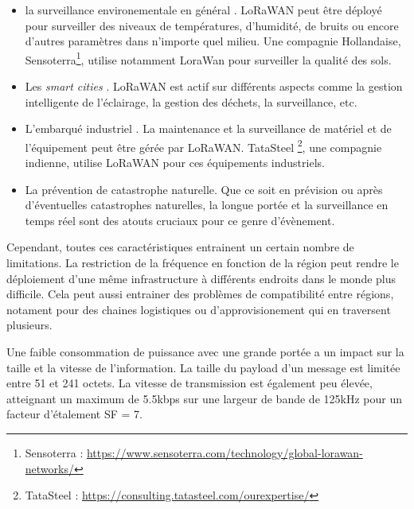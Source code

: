 \begin{itemize}

\item la surveillance environementale en général \cite{lorauc1}. LoRaWAN peut être déployé pour surveiller des niveaux de températures, d'humidité, de bruits ou encore d'autres paramètres dans n'importe quel milieu. Une compagnie Hollandaise, Sensoterra\footnote{Sensoterra : \href{https://www.sensoterra.com/technology/global-lorawan-networks/}{https://www.sensoterra.com/technology/global-lorawan-networks/}}, utilise notamment LoraWan pour surveiller la qualité des sols.
\item Les \textit{smart cities} \cite{lorauc2}. LoRaWAN est actif sur différents aspects comme la gestion intelligente de l'éclairage, la gestion des déchets, la surveillance, etc.
\item L'embarqué industriel \cite{lorauc3}. La maintenance et la surveillance de matériel et de l'équipement peut être gérée par LoRaWAN. TataSteel \footnote{TataSteel : \href{https://consulting.tatasteel.com/our_expertise/plant-infrastructure-and-logistics/}{https://consulting.tatasteel.com/ourexpertise/}}, une compagnie indienne, utilise LoRaWAN pour ces équipements industriels.
\item La prévention de catastrophe naturelle. Que ce soit en prévision\cite{lorauc41} ou après\cite{lorauc43} d'éventuelles catastrophes naturelles, la longue portée et la surveillance en temps réel sont des atouts cruciaux pour ce genre d'évènement.
\end{itemize}

\vspace{0.1cm}

Cependant, toutes ces caractéristiques entrainent un certain nombre de limitations. La restriction de la fréquence en fonction de la région peut rendre le déploiement d'une même infrastructure à différents endroits dans le monde plus difficile. Cela peut aussi entrainer des problèmes de compatibilité entre régions, notament pour des chaines logistiques ou d'approvisionement qui en traversent plusieurs.

\vspace{0.1cm}

Une faible consommation de puissance avec une grande portée a un impact sur la taille et la vitesse de l'information. La taille du payload d'un message est limitée entre 51 et 241 octets. La vitesse de transmission est également peu élevée, atteignant un maximum de 5.5kbps sur une largeur de bande de 125kHz pour un facteur d'étalement SF = 7.


